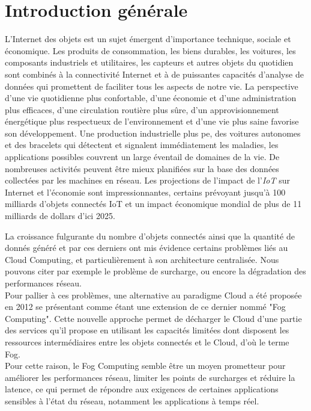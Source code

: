 \chapter{Introduction générale}
\thispagestyle{empty}
\newpage
\par L'Internet des objets est un sujet émergent d'importance technique, sociale et économique. Les produits de consommation, les biens durables, les voitures, les composants industriels et utilitaires, les capteurs et autres objets du quotidien sont combinés à la connectivité Internet et à de puissantes capacités d'analyse de données qui promettent de faciliter tous les aspects de notre vie. La perspective d’une vie quotidienne plus confortable, d’une économie et d’une administration plus efficaces, d'une circulation routière plus sûre, d’un approvisionnement énergétique plus respectueux de l'environnement et d’une vie plus saine favorise son développement. Une production industrielle plus pe, des voitures autonomes et des bracelets qui détectent et signalent immédiatement les maladies, les applications possibles couvrent un large éventail de domaines de la vie. De nombreuses activités peuvent être mieux planifiées sur la base des données collectées par les machines en réseau. Les projections de l'impact de l'\emph{IoT} sur Internet et l'économie sont impressionnantes, certains prévoyant jusqu'à 100 milliards d'objets connectés IoT et un impact économique mondial de plus de 11 milliards de dollars d'ici 2025. \par
La croissance fulgurante du nombre d'objets connectés ainsi que la quantité de donnés généré et par ces derniers ont mis évidence certains problèmes liés au Cloud Computing, et particulièrement à son architecture centralisée. Nous pouvons citer par exemple le problème de surcharge, ou encore la dégradation des performances réseau.\\
Pour pallier à ces problèmes, une alternative au paradigme Cloud a été proposée en 2012 se présentant comme étant une extension de ce dernier nommé "Fog Computing". Cette nouvelle approche permet de décharger le Cloud d'une partie des services qu'il propose en utilisant les capacités limitées dont disposent les ressources intermédiaires entre les objets connectés et le Cloud, d'où le terme Fog.\\ 
Pour cette raison, le Fog Computing semble être un moyen prometteur pour améliorer les performances réseau, limiter les points de surcharges et réduire la latence, ce qui permet de répondre aux exigences de certaines applications sensibles à l'état du réseau, notamment les applications à temps réel.\\
